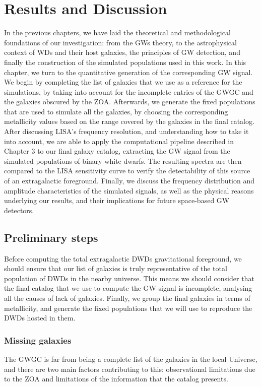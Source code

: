 \chapter{Results and Discussion}
In the previous chapters, we have laid the theoretical and methodological foundations of our investigation:  
from the GWs theory, to the astrophysical context of WDs and their host galaxies, the principles of GW detection, and finally the construction of the simulated populations used in this work.  
In this chapter, we turn to the quantitative generation of the corresponding GW signal.  
We begin by completing the list of galaxies that we use as a reference for the simulations, by taking into account for the incomplete entries of the GWGC and the galaxies obscured by the ZOA.
Afterwards, we generate the fixed populations that are used to simulate all the galaxies, by choosing the corresponding metallicity values based on the range covered by the galaxies in the final catalog.
After discussing LISA's frequency resolution, and understanding how to take it into account, we are able to apply the computational pipeline described in Chapter 3 to our final galaxy catalog, extracting the GW signal from the simulated populations of binary white dwarfs.  
The resulting spectra are then compared to the LISA sensitivity curve to verify the detectability of this source of an extragalactic foreground.  
Finally, we discuss the frequency distribution and amplitude characteristics of the simulated signals, as well as the physical reasons underlying our results, and their implications for future space-based GW detectors.


\section{Preliminary steps}
Before computing the total extragalactic DWDs gravitational foreground, we {should} ensure that our list of galaxies is truly representative of the total population of DWDs in the nearby universe. 
This means we {should} consider that the final catalog that we use to compute the GW signal is incomplete, analysing all the causes of lack of galaxies.
Finally, we group the final galaxies in terms of metallicity, and generate the fixed populations that we will use to reproduce the DWDs hosted in them.

\subsection{Missing galaxies}
The GWGC is far from being a complete list of the galaxies in the local Universe, and there are two main factors contributing to this: observational limitations due to the ZOA and limitations of the information that the catalog presents.

